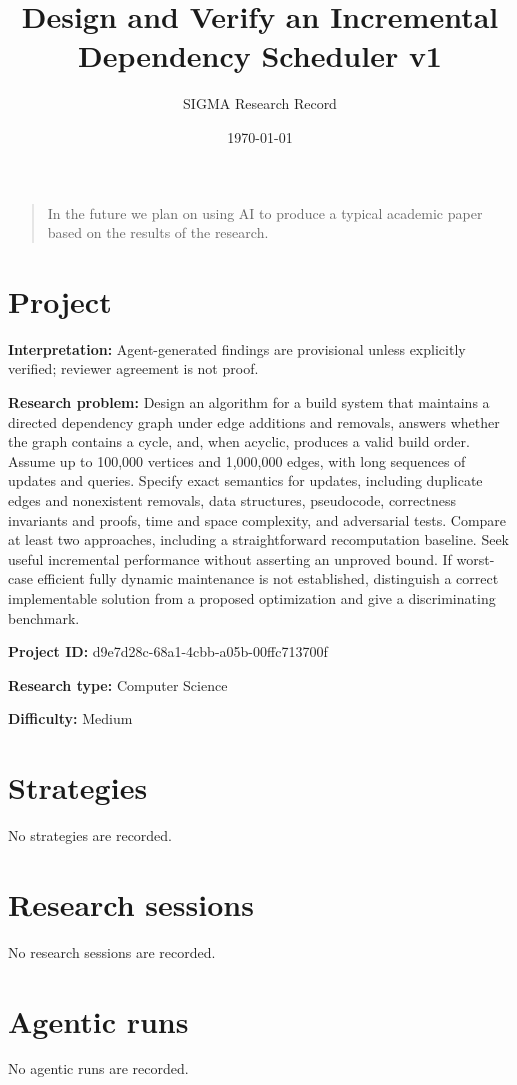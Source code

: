 \documentclass[11pt]{article}
\title{Design and Verify an Incremental Dependency Scheduler v1}
\author{SIGMA Research Record}
\date{\today}
\begin{document}
\maketitle
\begin{quote}\small In the future we plan on using AI to produce a typical academic paper based on the results of the research.\end{quote}
\section{Project}
\textbf{Interpretation:} Agent-generated findings are provisional unless explicitly verified; reviewer agreement is not proof.\par
\textbf{Research problem:} Design an algorithm for a build system that maintains a directed dependency graph under edge additions and removals, answers whether the graph contains a cycle, and, when acyclic, produces a valid build order. Assume up to 100,000 vertices and 1,000,000 edges, with long sequences of updates and queries. Specify exact semantics for updates, including duplicate edges and nonexistent removals, data structures, pseudocode, correctness invariants and proofs, time and space complexity, and adversarial tests. Compare at least two approaches, including a straightforward recomputation baseline. Seek useful incremental performance without asserting an unproved bound. If worst-case efficient fully dynamic maintenance is not established, distinguish a correct implementable solution from a proposed optimization and give a discriminating benchmark.\par
\textbf{Project ID:} d9e7d28c-68a1-4cbb-a05b-00ffc713700f\par
\textbf{Research type:} Computer Science\par
\textbf{Difficulty:} Medium\par
\section{Strategies}
No strategies are recorded.\par
\section{Research sessions}
No research sessions are recorded.\par
\section{Agentic runs}
No agentic runs are recorded.\par
\end{document}
